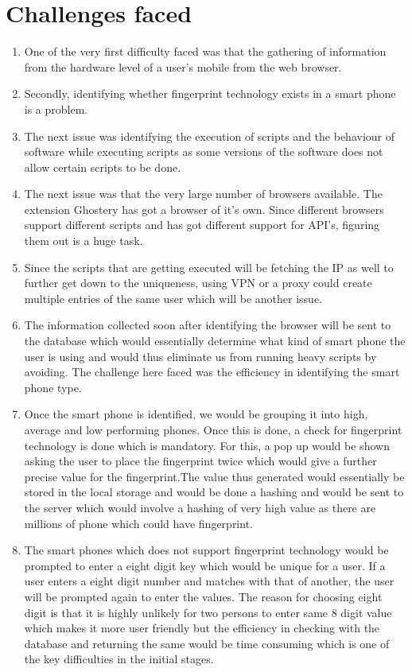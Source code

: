 \documentclass[journal]{IEEEtran}
\begin{document}
\section{Challenges faced}
\begin{enumerate}
\item One of the very first difficulty faced was that the gathering of information from the hardware level of a user's mobile from the web browser.  
\item Secondly, identifying whether fingerprint technology exists in a smart phone is a problem. 
\item The next issue was identifying the execution of scripts and the behaviour of software while executing scripts as some versions of the software does not allow certain scripts to be done. 
\item The next issue was that the very large number of browsers available. The extension Ghostery has got a browser of it's own. Since different browsers support different scripts and has got different support for API's, figuring them out is a huge task. 
\item Since the scripts that are getting executed will be fetching the IP as well to further get down to the uniqueness, using VPN or a proxy could create multiple entries of the same user which will be another issue. 
\item The information collected soon after identifying the browser will be sent to the database which would essentially determine what kind of smart phone the user is using and would thus eliminate us from running heavy scripts by avoiding. The challenge here faced was the efficiency in identifying the smart phone type. 
\item Once the smart phone is identified, we would be grouping it into high, average and low performing phones. Once this is done, a check for fingerprint technology is done which is mandatory. For this, a pop up would be shown asking the user to place the fingerprint twice which would give a further precise value for the fingerprint.The value thus generated would essentially be stored in the local storage and would be done a hashing and would be sent to the server which would involve a hashing of very high value as there are millions of phone which could have fingerprint. 
\item The smart phones which does not support fingerprint technology would be prompted to enter a eight digit key which would be unique for a user. If a user enters a eight digit number and matches with that of another, the user will be prompted again to enter the values. The reason for choosing eight digit is that it is highly unlikely for two persons to enter same 8 digit value which makes it more user friendly but the efficiency in checking with the database and returning the same would be time consuming which is one of the key difficulties in the initial stages.

\end{enumerate}
\end{document}

